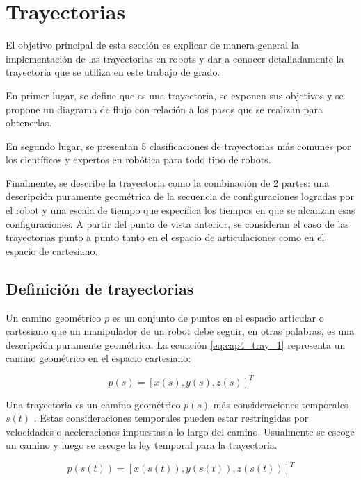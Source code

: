    \newpage

\section{Trayectorias}\label{cap4_tray}

    El objetivo principal de esta sección es explicar de manera general la implementación de las trayectorias en robots y dar a conocer detalladamente la trayectoria que se utiliza en este trabajo de grado.
    
    En primer lugar, se define que es una trayectoria, se exponen sus objetivos y se propone un diagrama de flujo con relación a los pasos que se realizan para obtenerlas.
    
    En segundo lugar, se presentan 5 clasificaciones de trayectorias más comunes por los científicos y expertos en robótica para todo tipo de robots.
    
    Finalmente, se describe la trayectoria como la combinación de 2 partes: una descripción puramente geométrica de la secuencia de configuraciones logradas por el robot y una escala de tiempo que especifica los tiempos en que se alcanzan esas configuraciones. A partir del punto de vista anterior, se consideran el caso de las trayectorias punto a punto tanto en el espacio de articulaciones como en el espacio de cartesiano.
    
    \subsection{Definición de trayectorias}
        Un camino geométrico $p$ es un conjunto de puntos en el espacio articular o cartesiano que un manipulador de un robot debe seguir, en otras palabras, es una descripción puramente geométrica. La ecuación \ref{eq:cap4_tray_1} representa un camino geométrico en el espacio cartesiano: 

        \begin{equation}
            p(s) = [x(s), y(s), z(s)]^T
        \label{eq:cap4_tray_1}
    \end{equation}  
    
    Una trayectoria es un camino geométrico $p(s)$  más consideraciones temporales $s(t)$ . Estas consideraciones temporales pueden estar restringidas por velocidades o aceleraciones impuestas a lo largo del camino. Usualmente se escoge un camino y luego se escoge la ley temporal para la trayectoria.
    
    \begin{equation}
            p(s(t)) = [x(s(t)), y(s(t)), z(s(t))]^T
        \label{eq:cap4_tray_2}
    \end{equation}  
    
